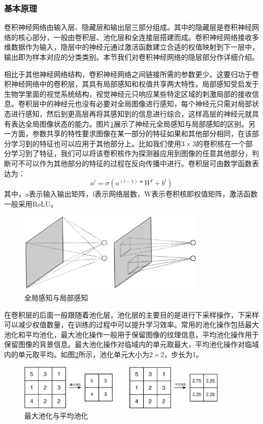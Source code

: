 \subsubsection{基本原理}
卷积神经网络由输入层、隐藏层和输出层三部分组成。其中的隐藏层是卷积神经网络的核心部分，一般由卷积层、池化层和全连接层搭建而成。卷积神经网络接收多维数据作为输入，隐层中的神经元通过激活函数建立合适的权值映射到下一层中，输出即为样本对应的分类类别。本节我们对卷积神经网络的隐层部分作详细介绍。

相比于其他神经网络结构，卷积神经网络之间链接所需的参数更少。这要归功于卷积神经网络中的卷积层，其具有局部感知和权值共享两大特性。局部感知受启发于生物学里面的视觉系统结构，视觉神经元只响应某些特定区域的刺激局部的接收信息。卷积层中的神经元也没有必要对全局图像进行感知，每个神经元只需对局部状态进行感知，然后到更高层再将其感知到的信息进行综合，这样高层的神经元就具有表达全局图像状态的能力。图片\ref{fig:cnn}展示了神经元全局感知与局部感知的区别。另一方面，参数共享的特性要求图像在某一部分的特征如果和其他部分相同，在该部分学习到的特征也可以应用于其他部分上。比如我们使用$3 \times 3$的卷积核在一个部分学习到了特征，我们可以将该卷积核作为探测器应用到图像的任意其他部分，判断可不可以作为其他部分的特征的过程在反向传播中进行。卷积层可由数学函数表达为：
\begin{equation}
 a^l= \sigma(a^(l-1) * W^l + b^l)
\end{equation}
其中，a表示输入输出矩阵，l表示网络层数，W表示卷积核即权值矩阵，激活函数一般采用ReLU。
\begin{figure}[thb]
\begin{center}
\includegraphics[width=0.8\textwidth]{figures/cnn.eps}
\caption{全局感知与局部感知}\label{fig:cnn}
\end{center}
\end{figure}

在卷积层的后面一般跟随着池化层，池化层的主要目的是进行下采样操作，下采样可以减少权值数量，在训练的过程中可以提升学习效率。常用的池化操作包括最大池化和平均池化，最大池化操作一般用于保留图像的纹理信息，平均池化操作用于保留图像的背景信息。最大池化操作对临域内的单元取最大，平均池化操作对临域内的单元取平均。如图\ref{fig:pooling}所示，池化单元大小为$2 \times 2$，步长为1。
\begin{figure}[thb]
\begin{center}
\includegraphics[width=0.9\textwidth]{figures/pooling.eps}
\caption{最大池化与平均池化}\label{fig:pooling}
\end{center}
\end{figure}

